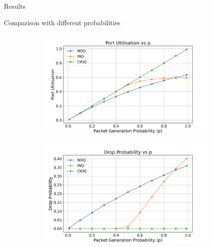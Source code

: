 \begin{section}{Results}

    \begin{subsection}{Comparison with different probabilities}

    \begin{figure}[h!]
        \centering
        \begin{subfigure}[b]{0.45\textwidth}
            \centering
            \includegraphics[width=\textwidth]{figures/fig1/fig1a.png}
        \end{subfigure}
        \hfill
        \begin{subfigure}[b]{0.45\textwidth}
            \centering
            \includegraphics[width=\textwidth]{figures/fig1/fig1b.png}
        \end{subfigure}
        \hfill
        \begin{subfigure}[b]{0.45\textwidth}
            \centering

\end{subfigure}
\end{figure}
\end{subsection}
\end{section}
